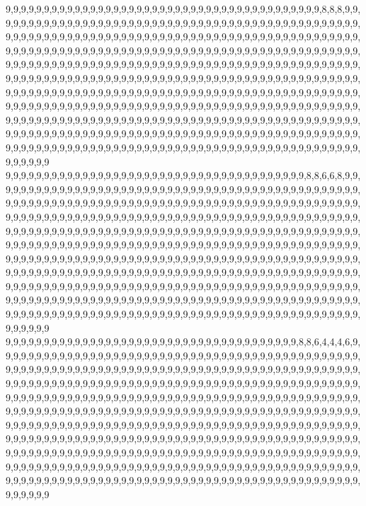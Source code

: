9,9,9,9,9,9,9,9,9,9,9,9,9,9,9,9,9,9,9,9,9,9,9,9,9,9,9,9,9,9,9,9,9,9,9,9,9,9,9,9,9,8,8,8,9,9,9,9,9,9,9,9,9,9,9,9,9,9,9,9,9,9,9,9,9,9,9,9,9,9,9,9,9,9,9,9,9,9,9,9,9,9,9,9,9,9,9,9,9,9,9,9,9,9,9,9,9,9,9,9,9,9,9,9,9,9,9,9,9,9,9,9,9,9,9,9,9,9,9,9,9,9,9,9,9,9,9,9,9,9,9,9,9,9,9,9,9,9,9,9,9,9,9,9,9,9,9,9,9,9,9,9,9,9,9,9,9,9,9,9,9,9,9,9,9,9,9,9,9,9,9,9,9,9,9,9,9,9,9,9,9,9,9,9,9,9,9,9,9,9,9,9,9,9,9,9,9,9,9,9,9,9,9,9,9,9,9,9,9,9,9,9,9,9,9,9,9,9,9,9,9,9,9,9,9,9,9,9,9,9,9,9,9,9,9,9,9,9,9,9,9,9,9,9,9,9,9,9,9,9,9,9,9,9,9,9,9,9,9,9,9,9,9,9,9,9,9,9,9,9,9,9,9,9,9,9,9,9,9,9,9,9,9,9,9,9,9,9,9,9,9,9,9,9,9,9,9,9,9,9,9,9,9,9,9,9,9,9,9,9,9,9,9,9,9,9,9,9,9,9,9,9,9,9,9,9,9,9,9,9,9,9,9,9,9,9,9,9,9,9,9,9,9,9,9,9,9,9,9,9,9,9,9,9,9,9,9,9,9,9,9,9,9,9,9,9,9,9,9,9,9,9,9,9,9,9,9,9,9,9,9,9,9,9,9,9,9,9,9,9,9,9,9,9,9,9,9,9,9,9,9,9,9,9,9,9,9,9,9,9,9,9,9,9,9,9,9,9,9,9,9,9,9,9,9,9,9,9,9,9,9,9,9,9,9,9,9,9,9,9,9,9,9,9,9,9,9,9,9,9,9,9,9,9,9,9,9,9,9,9,9,9,9,9,9,9,9,9,9,9,9,9,9,9,9,9,9,9,9,9,9,9,9,9,9,9,9,9,9,9,9,9,9,9,9,9,9,9,9,9,9,9,9,9,9,9,9,9,9,9,9,9
9,9,9,9,9,9,9,9,9,9,9,9,9,9,9,9,9,9,9,9,9,9,9,9,9,9,9,9,9,9,9,9,9,9,9,9,9,9,9,8,8,6,6,8,9,9,9,9,9,9,9,9,9,9,9,9,9,9,9,9,9,9,9,9,9,9,9,9,9,9,9,9,9,9,9,9,9,9,9,9,9,9,9,9,9,9,9,9,9,9,9,9,9,9,9,9,9,9,9,9,9,9,9,9,9,9,9,9,9,9,9,9,9,9,9,9,9,9,9,9,9,9,9,9,9,9,9,9,9,9,9,9,9,9,9,9,9,9,9,9,9,9,9,9,9,9,9,9,9,9,9,9,9,9,9,9,9,9,9,9,9,9,9,9,9,9,9,9,9,9,9,9,9,9,9,9,9,9,9,9,9,9,9,9,9,9,9,9,9,9,9,9,9,9,9,9,9,9,9,9,9,9,9,9,9,9,9,9,9,9,9,9,9,9,9,9,9,9,9,9,9,9,9,9,9,9,9,9,9,9,9,9,9,9,9,9,9,9,9,9,9,9,9,9,9,9,9,9,9,9,9,9,9,9,9,9,9,9,9,9,9,9,9,9,9,9,9,9,9,9,9,9,9,9,9,9,9,9,9,9,9,9,9,9,9,9,9,9,9,9,9,9,9,9,9,9,9,9,9,9,9,9,9,9,9,9,9,9,9,9,9,9,9,9,9,9,9,9,9,9,9,9,9,9,9,9,9,9,9,9,9,9,9,9,9,9,9,9,9,9,9,9,9,9,9,9,9,9,9,9,9,9,9,9,9,9,9,9,9,9,9,9,9,9,9,9,9,9,9,9,9,9,9,9,9,9,9,9,9,9,9,9,9,9,9,9,9,9,9,9,9,9,9,9,9,9,9,9,9,9,9,9,9,9,9,9,9,9,9,9,9,9,9,9,9,9,9,9,9,9,9,9,9,9,9,9,9,9,9,9,9,9,9,9,9,9,9,9,9,9,9,9,9,9,9,9,9,9,9,9,9,9,9,9,9,9,9,9,9,9,9,9,9,9,9,9,9,9,9,9,9,9,9,9,9,9,9,9,9,9,9,9,9,9,9,9,9,9,9,9,9,9,9,9,9,9,9,9,9,9,9,9,9,9,9,9,9,9,9,9,9,9
9,9,9,9,9,9,9,9,9,9,9,9,9,9,9,9,9,9,9,9,9,9,9,9,9,9,9,9,9,9,9,9,9,9,9,9,9,9,8,8,6,4,4,4,6,9,9,9,9,9,9,9,9,9,9,9,9,9,9,9,9,9,9,9,9,9,9,9,9,9,9,9,9,9,9,9,9,9,9,9,9,9,9,9,9,9,9,9,9,9,9,9,9,9,9,9,9,9,9,9,9,9,9,9,9,9,9,9,9,9,9,9,9,9,9,9,9,9,9,9,9,9,9,9,9,9,9,9,9,9,9,9,9,9,9,9,9,9,9,9,9,9,9,9,9,9,9,9,9,9,9,9,9,9,9,9,9,9,9,9,9,9,9,9,9,9,9,9,9,9,9,9,9,9,9,9,9,9,9,9,9,9,9,9,9,9,9,9,9,9,9,9,9,9,9,9,9,9,9,9,9,9,9,9,9,9,9,9,9,9,9,9,9,9,9,9,9,9,9,9,9,9,9,9,9,9,9,9,9,9,9,9,9,9,9,9,9,9,9,9,9,9,9,9,9,9,9,9,9,9,9,9,9,9,9,9,9,9,9,9,9,9,9,9,9,9,9,9,9,9,9,9,9,9,9,9,9,9,9,9,9,9,9,9,9,9,9,9,9,9,9,9,9,9,9,9,9,9,9,9,9,9,9,9,9,9,9,9,9,9,9,9,9,9,9,9,9,9,9,9,9,9,9,9,9,9,9,9,9,9,9,9,9,9,9,9,9,9,9,9,9,9,9,9,9,9,9,9,9,9,9,9,9,9,9,9,9,9,9,9,9,9,9,9,9,9,9,9,9,9,9,9,9,9,9,9,9,9,9,9,9,9,9,9,9,9,9,9,9,9,9,9,9,9,9,9,9,9,9,9,9,9,9,9,9,9,9,9,9,9,9,9,9,9,9,9,9,9,9,9,9,9,9,9,9,9,9,9,9,9,9,9,9,9,9,9,9,9,9,9,9,9,9,9,9,9,9,9,9,9,9,9,9,9,9,9,9,9,9,9,9,9,9,9,9,9,9,9,9,9,9,9,9,9,9,9,9,9,9,9,9,9,9,9,9,9,9,9,9,9,9,9,9,9,9,9,9,9,9,9,9,9,9,9,9,9,9,9,9,9,9,9
